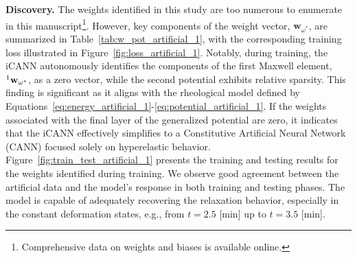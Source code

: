 \textbf{Discovery.} The weights identified in this study are too numerous to enumerate in this manuscript\footnote{Comprehensive data on weights and biases is available online.}. 
However, key components of the weight vector, $\mathbf{w}_{\omega^*}$, are summarized in Table~\ref{tab:w_pot_artificial_1}, with the corresponding training loss illustrated in Figure~\ref{fig:loss_artificial_1}. 
Notably, during training, the iCANN autonomously identifies the components of the first Maxwell element, $\prescript{1}{}{}\mathbf{w}_{\omega^*}$, as a zero vector, while the second potential exhibits relative sparsity. 
This finding is significant as it aligns with the rheological model defined by Equations~\eqref{eq:energy_artificial_1}-\eqref{eq:potential_artificial_1}. 
If the weights associated with the final layer of the generalized potential are zero, it indicates that the iCANN effectively simplifies to a Constitutive Artificial Neural Network (CANN) focused solely on hyperelastic behavior.
Figure~\ref{fig:train_test_artificial_1} presents the training and testing results for the weights identified during training. 
We observe good agreement between the artificial data and the model's response in both training and testing phases.
The model is capable of adequately recovering the relaxation behavior, especially in the constant deformation states, e.g., from $t=2.5$ [min] up to $t=3.5$ [min].

